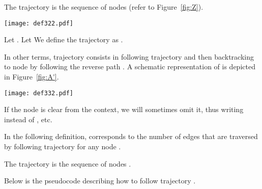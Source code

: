 \documentclass [11pt] {article}
\begin{document}
\begin{definition}
\label{def:Z}
The trajectory  is the sequence of nodes  {(refer to Figure~\ref{fig:Z})}.
\end{definition}

\begin{figure*}[httb!]
	\begin{center}
	\texttt{[image: def322.pdf]}
	\caption{{A schematic representation of trajectory  which is made up of a sequence of consecutive trajectories  from  to .}}
	\label{fig:Z}
	\end{center}
\end{figure*}


\begin{definition}
\label{def:A}
Let . Let  We define
the trajectory  as . 
\end{definition}
\newpage
{In other terms, trajectory  consists in following trajectory  and then backtracking to node  by following the reverse path . A schematic representation of  is depicted in Figure~\ref{fig:A'}.}

\begin{figure*}[httb!]
	\begin{center}
	\texttt{[image: def332.pdf]}
	\caption{{A schematic representation of trajectory  which consists in following trajectory  with the following insertions: for all , before going from node  to  the agent follows trajectory .}}
	\label{fig:A'}
	\end{center}
\end{figure*}


{If the node  is clear from the context, we will sometimes omit it, thus writing  instead of , etc.}

{In the following definition,  corresponds to the number of edges that are traversed by following trajectory  for any node .} 
\begin{definition}
\label{def:B}
The trajectory  is the sequence of nodes . 
\end{definition}

{Below is the pseudocode describing how to follow trajectory .}

\begin{center}
\end{center} 
\end{document}
